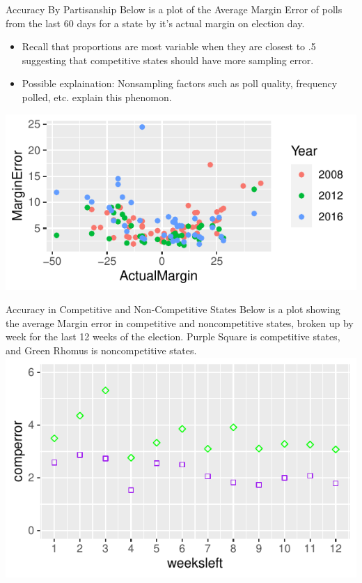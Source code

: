\documentclass{beamer}\usepackage[]{graphicx}\usepackage[]{color}
\makeatletter
\def\maxwidth{ %
  \ifdim\Gin@nat@width>\linewidth
    \linewidth
  \else
    \Gin@nat@width
  \fi
}
\newenvironment{knitrout}{}{} %
\makeatother
\begin{document}
\begin{frame}{Accuracy By Partisanship}
Below is a plot of the Average Margin Error of polls from the last 60 days for a state by it's actual margin on election day. 
\begin{itemize}
\item Recall that proportions are most variable when they are closest to .5 suggesting that competitive states should have more sampling error.
\item Possible explaination: Nonsampling factors such as poll quality, frequency polled, etc.  explain this phenomon.
\end{itemize}
\begin{knitrout}
\color{fgcolor}
\includegraphics[width=\maxwidth]{figure/unnamed-chunk-3-1} 

\end{knitrout}

\end{frame}

\begin{frame}{Accuracy in Competitive and Non-Competitive States}
Below is a plot showing the average Margin error in competitive and noncompetitive states, broken up by week for the last 12 weeks of the election. Purple Square is competitive states, and Green Rhomus is noncompetitive states.
\begin{knitrout}
\color{fgcolor}
\includegraphics[width=\maxwidth]{figure/unnamed-chunk-4-1} 

\end{knitrout}

\end{frame}
\end{document}
